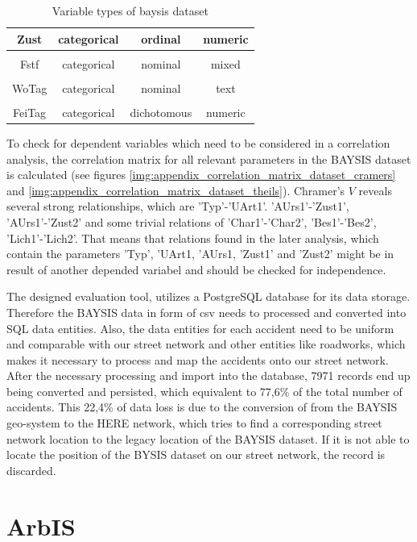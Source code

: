\documentclass[a4paper,12pt]{report}
\begin{document}
\begin{table}[ht]
\begin{tabular}{c|c|c|c}
		Zust 		& categorical 	& ordinal	& numeric\\
		\hline
		\\[-1em]
		Fstf 		& categorical 	& nominal	& mixed\\
		\hline
		\\[-1em]
		WoTag 		& categorical 	& nominal	& text\\
		\hline
		\\[-1em]
		FeiTag 		& categorical 	& dichotomous	& numeric\\
	\end{tabular}
	\caption{Variable types of \acrshort{baysis} dataset}
	\label{tab:table_baysis_paramters}
\end{table}

To check for dependent variables which need to be considered in a correlation analysis, the correlation matrix for all relevant parameters in the BAYSIS dataset is calculated (see figures \ref{img:appendix_correlation_matrix_dataset_cramers} and \ref{img:appendix_correlation_matrix_dataset_theils}). Chramer's $V$ reveals several strong relationships, which are 'Typ'-'UArt1'. 'AUrs1'-'Zust1', 'AUrs1'-'Zust2' and some trivial relations of 'Char1'-'Char2', 'Bes1'-'Bes2', 'Lich1'-'Lich2'. That means that relations found in the later analysis, which contain the parameters 'Typ', 'UArt1, 'AUrs1, 'Zust1' and 'Zust2' might be in result of another depended variabel and should be checked for independence.

\bigskip

The designed evaluation tool, utilizes a PostgreSQL database for its data storage. Therefore the BAYSIS data in form of \acrfull{csv} needs to processed and converted into SQL data entities. Also, the data entities for each accident need to be uniform and comparable with our street network and other entities like roadworks, which makes it necessary to process and map the accidents onto our street network. After the necessary processing and import into the database, 7971 records end up being converted and persisted, which equivalent to 77,6\% of the total number of accidents. This 22,4\% of data loss is due to the conversion of from the BAYSIS geo-system to the HERE network, which tries to find a corresponding street network location to the legacy location of the BAYSIS dataset. If it is not able to locate the position of the BYSIS dataset on our street network, the record is discarded.

\section{ArbIS}
\label{dataset_arbis}
\end{document}
